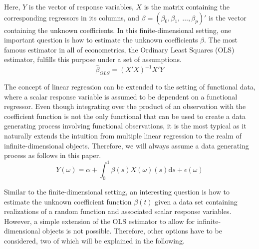 \documentclass[11pt,twoside,a4paper]{article}
\begin{document}
	Here, $Y$ is the vector of response variables, $X$ is the matrix containing the corresponding regressors in its columns, and $\beta = (\beta_0, \beta_1, \: \dots, \beta_p)'$ is the vector containing the unknown coefficients.
	In this finite-dimensional setting, one important question is how to estimate the unknown coefficients $\beta$. The most famous estimator in all of econometrics, the Ordinary Least Squares (OLS) estimator, fulfills this purpose under a set of assumptions.
	\begin{equation}
		\hat{\beta}_{OLS} = (X'X)^{-1}X'Y
	\end{equation}
	
	The concept of linear regression can be extended to the setting of functional data, where a scalar response variable is assumed to be dependent on a functional regressor. 
	Even though integrating over the product of an observation with the coefficient function is not the only functional that can be used to create a data generating process involving functional observations, it is the most typical as it naturally extends the intuition from multiple linear regression to the realm of infinite-dimensional objects. Therefore, we will always assume a data generating process as follows in this paper.
	\begin{equation}\label{DGP}
		Y(\omega) = \alpha + \int_{0}^{1} \beta(s)X(\omega)(s) \mathrm{d}s + \epsilon(\omega)
	\end{equation}
	
	Similar to the finite-dimensional setting, an interesting question is how to estimate the unknown coefficient function $\beta(t)$ given a data set containing realizations of a random function and associated scalar response variables. However, a simple extension of the OLS estimator to allow for infinite-dimensional objects is not possible. Therefore, other options have to be considered, two of which will be explained in the following.
	
\end{document}
